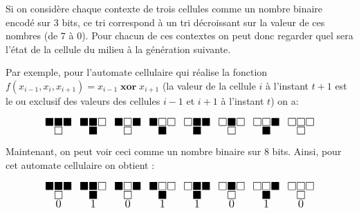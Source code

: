 	Si on considère chaque contexte de trois cellules comme un nombre binaire encodé sur 3 bits, ce tri correspond 
	à un tri décroissant sur la
	valeur de ces nombres (de $7$ à $0$). Pour  chacun de ces contextes on peut donc regarder  quel sera l'état 
	de la cellule du milieu à la génération suivante. 
	
	Par exemple, pour l'automate cellulaire qui réalise la 
	fonction $f(x_{i-1}, x_i, x_{i+1}) = x_{i-1} \; \mathbf{xor} \; x_{i+1}$ (la valeur de la cellule $i$ à l'instant $t+1$ est le ou exclusif des valeurs des cellules $i-1$ et $i+1$ à l'instant $t$) on a:


	\[ \LARGE
		\substack{\blacksquare \blacksquare \blacksquare \\ \square } \enspace
		\substack{\blacksquare \blacksquare \square \\ \blacksquare} \enspace
		\substack{\blacksquare \square \blacksquare \\ \square} \enspace
		\substack{\blacksquare \square \square \\ \blacksquare} \enspace
		\substack{\square \blacksquare \blacksquare \\ \blacksquare} \enspace
		\substack{\square \blacksquare \square \\ \square} \enspace
		\substack{\square \square \blacksquare \\ \blacksquare} \enspace
		\substack{\square \square \square \\ \square}
	\]

	Maintenant, on peut voir ceci comme un nombre binaire sur 8 bits. Ainsi, pour cet automate cellulaire on obtient :
	


	\[ \LARGE
		\substack{\blacksquare \blacksquare \blacksquare \\ \square \\ 0 } \enspace
		\substack{\blacksquare \blacksquare \square \\ \blacksquare \\ 1} \enspace
		\substack{\blacksquare \square \blacksquare \\ \square \\ 0} \enspace
		\substack{\blacksquare \square \square \\ \blacksquare \\ 1} \enspace
		\substack{\square \blacksquare \blacksquare \\ \blacksquare \\ 1} \enspace
		\substack{\square \blacksquare \square \\ \square \\ 0} \enspace
		\substack{\square \square \blacksquare \\ \blacksquare \\ 1} \enspace
		\substack{\square \square \square \\ \square \\ 0}
	\]

